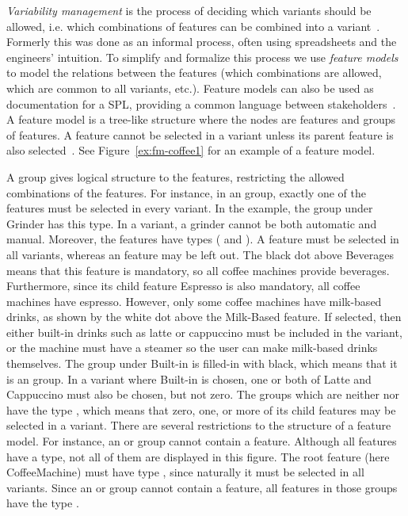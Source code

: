 \emph{Variability management} is the process of deciding which variants should be allowed, i.e. which combinations of features can be combined into a variant~\cite{art:variability-management-with-feature-models}. Formerly this was done as an informal process, often using spreadsheets and the engineers' intuition. To simplify and formalize this process we use \emph{feature models} to model the relations between the features (which combinations are allowed, which are common to all variants, etc.). Feature models can also be used as documentation for a SPL, providing a common language between stakeholders~\cite{book:introduction-to-spl}. A feature model is a tree-like structure where the nodes are features and groups of features. A feature cannot be selected in a variant unless its parent feature is also selected~\cite{art:feature-models-grammars-and-propositional-formulas}. See Figure~\vref{ex:fm-coffee1} for an example of a feature model. 

A group gives logical structure to the features, restricting the allowed combinations of the features. For instance, in an \xortype{} group, exactly one of the features must be selected in every variant. In the example, the group under Grinder has this type. In a variant, a grinder cannot be both automatic and manual. Moreover, the features have types (\optional{} and \mandatory{}). A \mandatory{} feature must be selected in all variants, whereas an \optional{} feature may be left out. The black dot above Beverages means that this feature is mandatory, so all coffee machines provide beverages. Furthermore, since its child feature Espresso is also mandatory, all coffee machines have espresso. However, only some coffee machines have milk-based drinks, as shown by the white dot above the Milk-Based feature. If selected, then either built-in drinks such as latte or cappuccino must be included in the variant, or the machine must have a steamer so the user can make milk-based drinks themselves. The group under Built-in is filled-in with black, which means that it is an \ortype{} group. In a variant where Built-in is chosen, one or both of Latte and Cappuccino must also be chosen, but not zero. The groups which are neither \xortype{} nor \ortype{} have the type \andtype{}, which means that zero, one, or more of its child features may be selected in a variant. There are several restrictions to the structure of a feature model. For instance, an \xortype{} or \ortype{} group cannot contain a \mandatory{} feature. Although all features have a type, not all of them are displayed in this figure. The root feature (here CoffeeMachine) must have type \mandatory{}, since naturally it must be selected in all variants. Since an \xortype{} or \ortype{} group cannot contain a \mandatory{} feature, all features in those groups have the type \optional{}.

